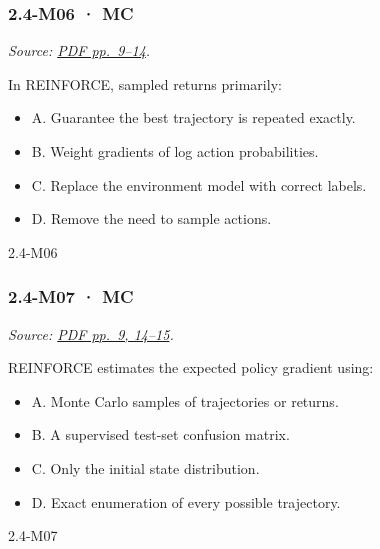 \noindent\begin{minipage}{\linewidth}

\subsubsection{2.4-M06 · MC}\label{m06-mc-6}

\emph{Source:
\href{../Lecture\%20Slides/2.4.\%20Policy\%20Search.pdf\#page=9}{PDF
pp.~9--14}.}

In REINFORCE, sampled returns primarily:

\begin{itemize}
\tightlist
\item
  A. Guarantee the best trajectory is repeated exactly.
\item
  B. Weight gradients of log action probabilities.
\item
  C. Replace the environment model with correct labels.
\item
  D. Remove the need to sample actions.
\end{itemize}

\begin{solution}[8mm]{2.4-M06}

\end{solution}
\end{minipage}\par\medskip

\noindent\begin{minipage}{\linewidth}

\subsubsection{2.4-M07 · MC}\label{m07-mc-6}

\emph{Source:
\href{../Lecture\%20Slides/2.4.\%20Policy\%20Search.pdf\#page=9}{PDF
pp.~9, 14--15}.}

REINFORCE estimates the expected policy gradient using:

\begin{itemize}
\tightlist
\item
  A. Monte Carlo samples of trajectories or returns.
\item
  B. A supervised test-set confusion matrix.
\item
  C. Only the initial state distribution.
\item
  D. Exact enumeration of every possible trajectory.
\end{itemize}

\begin{solution}[8mm]{2.4-M07}

\end{solution}
\end{minipage}\par\medskip

